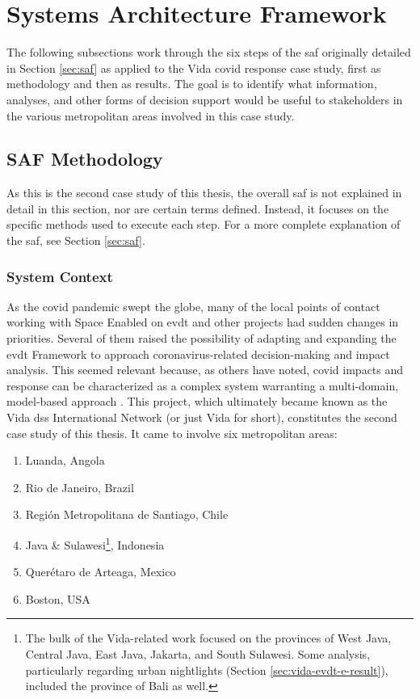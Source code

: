 \section{Systems Architecture Framework} \label{sec:vida-saf}

The following subsections work through the six steps of the \ac{saf} originally detailed in Section \ref{sec:saf} as applied to the Vida \ac{covid} response case study, first as methodology and then as results. The goal is to identify what information, analyses, and other forms of decision support would be useful to stakeholders in the various metropolitan areas involved in this case study.

\subsection{SAF Methodology} \label{sec:vida-saf-method}

As this is the second case study of this thesis, the overall \ac{saf} is not explained in detail in this section, nor are certain terms defined. Instead, it focuses on the specific methods used to execute each step. For a more complete explanation of the \ac{saf}, see Section \ref{sec:saf}.

\subsubsection{System Context}

As the \ac{covid} pandemic swept the globe, many of the local points of contact working with Space Enabled on \ac{evdt} and other projects had sudden changes in priorities. Several of them raised the possibility of adapting and expanding the \ac{evdt} Framework to approach coronavirus-related decision-making and impact analysis. This seemed relevant because, as others have noted, \ac{covid} impacts and response can be characterized as a complex system warranting a multi-domain, model-based approach \cite{deweckHandlingCOVID192020}. This project,  which ultimately became known as the Vida \ac{dss} International Network (or just Vida for short), constitutes the second case study of this thesis. It came to involve six metropolitan areas:

\begin{enumerate}[itemsep=0pt,parsep=0pt]
    \item{Luanda, Angola}
    \item Rio de Janeiro, Brazil
    \item Región Metropolitana de Santiago, Chile
    \item{Java \& Sulawesi\footnote{The bulk of the Vida-related work focused on the provinces of West Java, Central Java, East Java, Jakarta, and South Sulawesi. Some analysis, particularly regarding urban nightlights (Section \ref{sec:vida-evdt-e-result}), included the province of Bali as well.}, Indonesia}
    \item{Querétaro de Arteaga, Mexico}
    \item{Boston, USA}
\end{enumerate}

